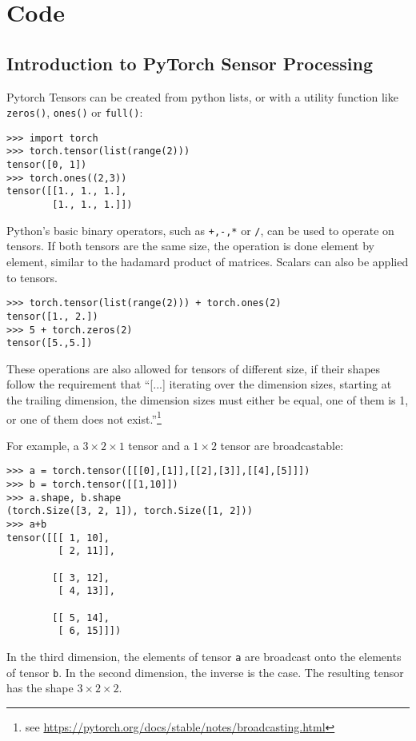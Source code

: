 \chapter{Code}
\section{Introduction to PyTorch Sensor Processing}
\label{sec:pytorch_tutorial}
Pytorch Tensors can be created from python lists,
or with a utility function like \verb|zeros()|, \verb|ones()| or \verb|full()|:
\begin{lstlisting}
>>> import torch
>>> torch.tensor(list(range(2)))
tensor([0, 1])
>>> torch.ones((2,3))
tensor([[1., 1., 1.],
        [1., 1., 1.]])
\end{lstlisting}

Python's basic binary operators, such as \verb|+,-,*| or \verb|/|, can be used to operate on tensors.
If both tensors are the same size, the operation is done element by element, similar to the hadamard product of matrices.
Scalars can also be applied to tensors.
\begin{lstlisting}
>>> torch.tensor(list(range(2))) + torch.ones(2)
tensor([1., 2.])
>>> 5 + torch.zeros(2)
tensor([5.,5.])
\end{lstlisting}

These operations are also allowed for tensors of different size, if their shapes follow the requirement that
``[...] iterating over the dimension sizes, starting at the trailing dimension,
the dimension sizes must either be equal, one of them is 1, or one of them does not exist.''\footnote{
    see \url{https://pytorch.org/docs/stable/notes/broadcasting.html}
}\newpage

For example, a $3 \times 2\times 1$ tensor and a $1 \times 2$ tensor are broadcastable:
\begin{lstlisting}
>>> a = torch.tensor([[[0],[1]],[[2],[3]],[[4],[5]]])
>>> b = torch.tensor([[1,10]])
>>> a.shape, b.shape
(torch.Size([3, 2, 1]), torch.Size([1, 2]))
>>> a+b
tensor([[[ 1, 10],
         [ 2, 11]],

        [[ 3, 12],
         [ 4, 13]],

        [[ 5, 14],
         [ 6, 15]]])
\end{lstlisting}
In the third dimension, the elements of tensor \verb|a| are broadcast onto the elements of tensor \verb|b|.
In the second dimension, the inverse is the case. The resulting tensor has the shape $3 \times 2\times 2$.

